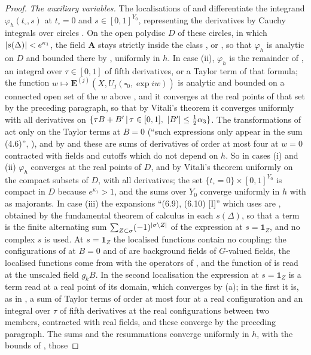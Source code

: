 \documentclass[11pt]{preprint}
\DeclarePairedDelimiter{\abs}{\lvert}{\rvert}
\numberwithin{equation}{section}
\theoremstyle{definition}
\theoremstyle{remark}
\theoremstyle{plain}
\begin{document}
\begin{proof}
\emph{The auxiliary variables.} The localisations of \cite[(1.9)--(1.10), p.~4]{BalabanRG2} and \cite[(3.15), p.~273]{BalabanRG1} differentiate the integrand $\varphi_h(t_\square, s)$ at $t_\square = 0$ and $s \in [0, 1]^{Y_0}$, representing the derivatives by Cauchy integrals over circles \cite[p.~7]{BalabanRG2}. On the open polydisc $D$ of these circles, in which $\abs{s(\Delta)} < e^{\kappa_1}$, the field $\mathbf A$ stays strictly inside the class \cite[(3.14)]{BalabanRG1}, or \cite[(3.31), p.~276]{BalabanRG1}, so that $\varphi_h$ is analytic on $D$ and bounded there by \cite[(3.17), p.~273, (3.54), p.~280]{BalabanRG1}, uniformly in $h$. In case (ii), $\varphi_h$ is the remainder of \cite[(3.34)]{BalabanRG1}, an integral over $\tau \in [0, 1]$ of fifth derivatives, or a Taylor term of that formula; the function $w \mapsto \mathbf E^{(j)}(X, U_j(\square_0, \exp iw))$ is analytic and bounded on a connected open set of the $w$ above \cite[(3.53)--(3.54)]{BalabanRG1}, and it converges at the real points of that set by the preceding paragraph, so that by Vitali's theorem it converges uniformly with all derivatives on $\{ \tau B + B' \, | \, \tau \in [0, 1],\ \abs{B'} \leq \frac12\alpha_3 \}$. The transformations of \cite[Sect.~4]{BalabanRG1} act only on the Taylor terms at $B = 0$ (``such expressions only appear in the sum (4.6)'', \cite[p.~284]{BalabanRG1}), and by \cite[(4.2)--(4.3), p.~281]{BalabanRG1} and \cite[(4.9)--(4.15), pp.~283--284]{BalabanRG1} these are sums of derivatives of order at most four at $w = 0$ contracted with fields and cutoffs which do not depend on $h$. So in cases (i) and (ii) $\varphi_h$ converges at the real points of $D$, and by Vitali's theorem uniformly on the compact subsets of $D$, with all derivatives; the set $\{ t_\square = 0 \} \times [0, 1]^{Y_0}$ is compact in $D$ because $e^{\kappa_1} > 1$, and the sums over $Y_0$ converge uniformly in $h$ with \cite[(1.24)--(1.29), pp.~7--8]{BalabanRG2} as majorants. In case (iii) the expansions ``(6.9), (6.10) [I]'' which \cite[pp.~372--374]{BalabanLFR2} uses are \cite[(1.9)--(1.10), p.~4]{BalabanRG2}, obtained by the fundamental theorem of calculus in each $s(\Delta)$, so that a term is the finite alternating sum $\sum_{Z \subset \sigma}(-1)^{\abs{\sigma \setminus Z}}$ of the expression at $s = \mathbf 1_Z$, and no complex $s$ is used. At $s = \mathbf 1_Z$ the localised functions contain no coupling: the configurations of \cite[(1.50), p.~370]{BalabanLFR2} at $B = 0$ and of \cite[(1.53), (1.56)]{BalabanLFR2} are background fields of $G$-valued fields, the localised functions come from \cite[Sects.~D, E]{BalabanVAR} with the operators of \cite{BalabanPBG}, and the function of \cite[(1.51)]{BalabanLFR2} is read at the unscaled field $g_kB$. In the second localisation the expression at $s = \mathbf 1_Z$ is a term read at a real point of its domain, which converges by (a); in the first it is, as in \cite[(3.34)]{BalabanRG1}, a sum of Taylor terms of order at most four at a real configuration and an integral over $\tau$ of fifth derivatives at the real configurations between two members, contracted with real fields, and these converge by the preceding paragraph. The sums and the resummations converge uniformly in $h$, with the bounds of \cite[(1.24)--(1.29), pp.~7--8]{BalabanRG2}, those 
\end{proof}
\end{document}
